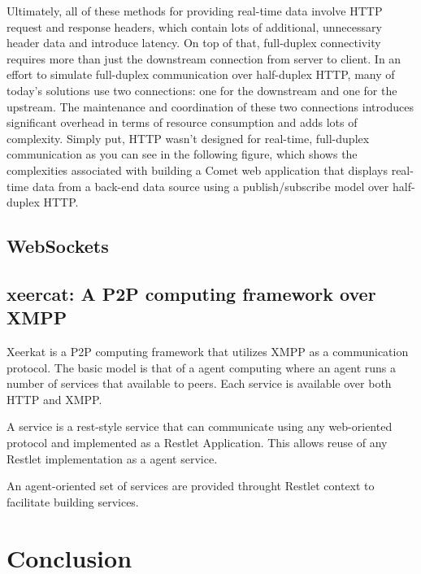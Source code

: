 \documentclass[12pt]{scrartcl}
\begin{document}
Ultimately, all of these methods for providing real-time data involve HTTP request and response headers, which contain lots of additional, unnecessary header data and introduce latency. On top of that, full-duplex connectivity requires more than just the downstream connection from server to client. In an effort to simulate full-duplex communication over half-duplex HTTP, many of today's solutions use two connections: one for the downstream and one for the upstream. The maintenance and coordination of these two connections introduces significant overhead in terms of resource consumption and adds lots of complexity. Simply put, HTTP wasn't designed for real-time, full-duplex communication as you can see in the following figure, which shows the complexities associated with building a Comet web application that displays real-time data from a back-end data source using a publish/subscribe model over half-duplex HTTP.

\subsection{WebSockets}

\subsection{xeercat: A P2P computing framework over XMPP}

Xeerkat is a P2P computing framework that utilizes XMPP as a communication protocol. The basic model is that of a agent computing where an agent runs a number of services that available to peers. Each service is available over both HTTP and XMPP.

A service is a rest-style service that can communicate using any web-oriented protocol and implemented as a Restlet Application. This allows reuse of any Restlet implementation as a agent service.

An agent-oriented set of services are provided throught Restlet context to facilitate building services.

\newpage

\section*{Conclusion} 



\end{document}
